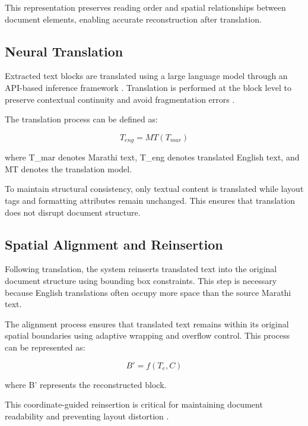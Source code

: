 \documentclass[11pt]{article}
\begin{document}
This representation preserves reading order and spatial relationships between document elements, enabling accurate reconstruction after translation.

\subsection{Neural Translation}

Extracted text blocks are translated using a large language model through an API-based inference framework \cite{touvron_llama:_2023,zhao_survey_2026}. Translation is performed at the block level to preserve contextual continuity and avoid fragmentation errors \cite{zhao_survey_2026,li_augmenting_2020}.

The translation process can be defined as:

\begin{equation}
T_{eng} = MT(T_{mar})
\end{equation}

where T\_mar denotes Marathi text, T\_eng denotes translated English text, and MT denotes the translation model.

To maintain structural consistency, only textual content is translated while layout tags and formatting attributes remain unchanged. This ensures that translation does not disrupt document structure.

\subsection{Spatial Alignment and Reinsertion}

Following translation, the system reinserts translated text into the original document structure using bounding box constraints. This step is necessary because English translations often occupy more space than the source Marathi text.

The alignment process ensures that translated text remains within its original spatial boundaries using adaptive wrapping and overflow control. This process can be represented as:

\begin{equation}
B' = f(T_e, C)
\end{equation}

where B' represents the reconstructed block.

This coordinate-guided reinsertion is critical for maintaining document readability and preventing layout distortion \cite{xu_layoutlm:_2020,xu_layoutlmv2:_2022,huang_layoutlmv3:_2022,appalaraju_docformer:_2021}.
\end{document}
